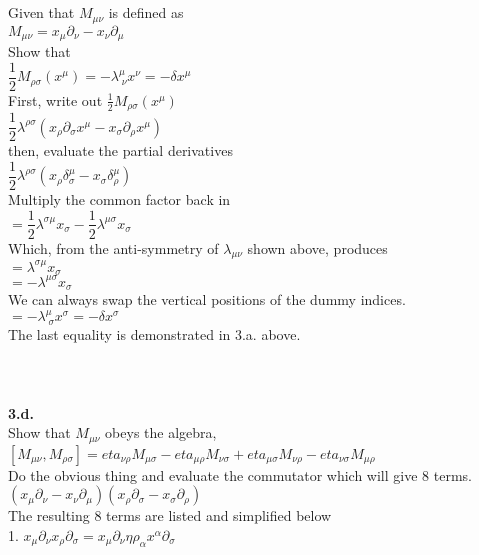 \documentclass[prb,preprint]
{revtex4-1}
\newcommand{\PRLsep}{\noindent\makebox[\linewidth]{\resizebox{0.8888\linewidth}{2pt}{$\bullet$}}\bigskip}
\begin{document}
\\
\\
Given that $M_{\mu\nu}$ is defined as 
\\
$M_{\mu\nu} = x_\mu\partial_\nu - x_\nu\partial_\mu$
\\
Show that 
\\
$\dfrac{1}{2} M_{\rho\sigma}\left(x^\mu\right) = -\lambda^\mu_{\;\nu} x^\nu = -\delta x^\mu$
\\
First, write out $\frac{1}{2}M_{\rho\sigma}\left(x^\mu\right)$
\\
$\dfrac{1}{2}\lambda^{\rho\sigma}\left(x_\rho \partial_\sigma x^\mu - x_\sigma \partial_\rho x^\mu\right)$
\\
then, evaluate the partial derivatives
\\
$\dfrac{1}{2}\lambda^{\rho\sigma}\left(x_\rho \delta^\mu_\sigma - x_\sigma \delta^\mu_\rho\right)$
\\
Multiply the common factor back in
\\
$= \dfrac{1}{2}\lambda^{\sigma\mu}x_\sigma - \dfrac{1}{2}\lambda^{\mu\sigma}x_\sigma$
\\
Which, from the anti-symmetry of $\lambda_{\mu\nu}$ shown above, produces
\\
$=\lambda^{\sigma\mu} x_\sigma$
\\
$=-\lambda^{\mu\sigma} x_\sigma$
\\
We can always swap the vertical positions of the dummy indices.
\\
$=-\lambda^\mu_{\;\sigma} x^\sigma = -\delta x^\sigma$
\\
The last equality is demonstrated in 3.a. above.
\\
\\
\PRLsep
\\
\\
\newpage
\textbf{3.d.}
\\
Show that $M_{\mu\nu}$ obeys the algebra, 
$\left[M_{\mu\nu}, M_{\rho\sigma}\right] = eta_{\nu\rho}M_{\mu\sigma} - eta_{\mu\rho}M_{\nu\sigma} + eta_{\mu\sigma}M_{\nu\rho} - eta_{\nu\sigma}M_{\mu\rho}$
\\
Do the obvious thing and evaluate the commutator which will give 8 terms.
\\
$\left(x_\mu \partial_\nu - x_\nu \partial_\mu\right)\left(x_\rho \partial_\sigma - x_\sigma \partial_\rho\right)$
\\
The resulting 8 terms are listed and simplified below
\\
1.  $x_\mu \partial_\nu x_\rho \partial_\sigma = x_\mu\partial_\nu\eta{\rho_\alpha}x^\alpha \partial_\sigma$
\end{document}
